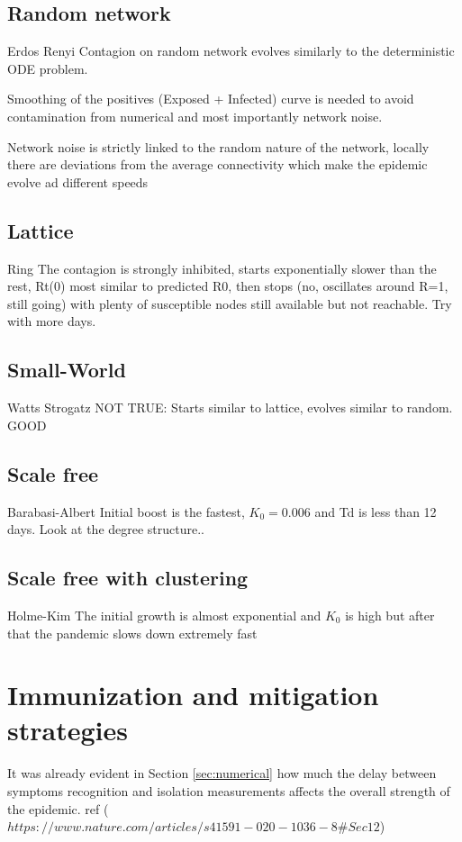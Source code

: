 \documentclass[DIV=12, BCOR=0pt]{scrartcl}  %
\begin{document}
  \subsection{Random network}
  Erdos Renyi
  Contagion on random network evolves similarly to the deterministic ODE problem. 
  
  Smoothing of the positives (Exposed + Infected) curve is needed to avoid contamination from numerical and most importantly network noise. 
  
  Network noise is strictly linked to the random nature of the network, locally there are deviations from the average connectivity which make the epidemic evolve ad different speeds
  
  
  \subsection{Lattice}
  Ring
  The contagion is strongly inhibited, starts exponentially slower than the rest, Rt(0) most similar to predicted R0,
  then stops (no, oscillates around R=1, still going) with plenty of susceptible nodes still available but not reachable. Try with more days.
  
  
  \subsection{Small-World}
  Watts Strogatz
  NOT TRUE: Starts similar to lattice, evolves similar to random. GOOD
  
  \subsection{Scale free}
  Barabasi-Albert
  Initial boost is the fastest, $K_0=0.006$ and Td is less than 12 days. Look at the degree structure..
  
  
  \subsection{Scale free with clustering}
  Holme-Kim
  The initial growth is almost exponential and $K_0$ is high but after that the pandemic slows down extremely fast
  
  
  
  
  
  
  \section{Immunization and mitigation strategies}
  \label{sec:immuni}
    It was already evident in Section \ref{sec:numerical} how much the delay between symptoms recognition and isolation measurements affects the overall strength of the epidemic.
    ref ($https://www.nature.com/articles/s41591-020-1036-8\#Sec12$)
    
\end{document}

